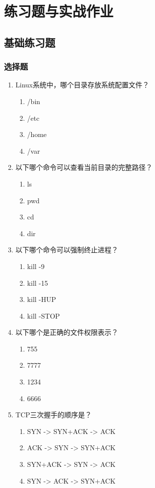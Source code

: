 \documentclass[12pt,UTF8]{ctexbook}
\begin{document}
\chapter{练习题与实战作业}
\label{chap:exercises}

\section{基础练习题}
\label{sec:basic-exercises}

\subsection*{选择题}

\begin{enumerate}
    \item Linux系统中，哪个目录存放系统配置文件？
    \begin{enumerate}
        \item /bin
        \item /etc
        \item /home
        \item /var
    \end{enumerate}
    
    \item 以下哪个命令可以查看当前目录的完整路径？
    \begin{enumerate}
        \item ls
        \item pwd
        \item cd
        \item dir
    \end{enumerate}
    
    \item 以下哪个命令可以强制终止进程？
    \begin{enumerate}
        \item kill -9
        \item kill -15
        \item kill -HUP
        \item kill -STOP
    \end{enumerate}
    
    \item 以下哪个是正确的文件权限表示？
    \begin{enumerate}
        \item 755
        \item 7777
        \item 1234
        \item 6666
    \end{enumerate}
    
    \item TCP三次握手的顺序是？
    \begin{enumerate}
        \item SYN -> SYN+ACK -> ACK
        \item ACK -> SYN -> SYN+ACK
        \item SYN+ACK -> SYN -> ACK
        \item SYN -> ACK -> SYN+ACK
    \end{enumerate}
\end{enumerate}
\end{document}
